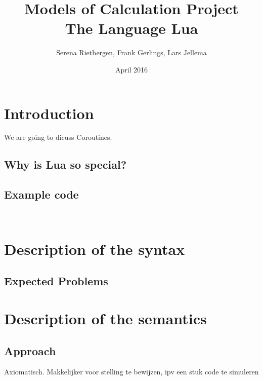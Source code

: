 \documentclass{article}
\title{Models of Calculation Project \\
         The Language Lua}
\author{Serena Rietbergen, Frank Gerlings, Lars Jellema}
\date{April 2016}
\begin{document}
\maketitle
\newpage

\tableofcontents
\newpage

\section{Introduction}
We are going to dicuss Coroutines.%
\subsection{Why is Lua so special?}
\subsection{Example code}
\begin{verbatim}
    
\end{verbatim}

\section{Description of the syntax}
\subsection{Expected Problems}

\section{Description of the semantics}
\subsection{Approach}
Axiomatisch. Makkelijker voor stelling te bewijzen, ipv een stuk code te simuleren
\end{document}
